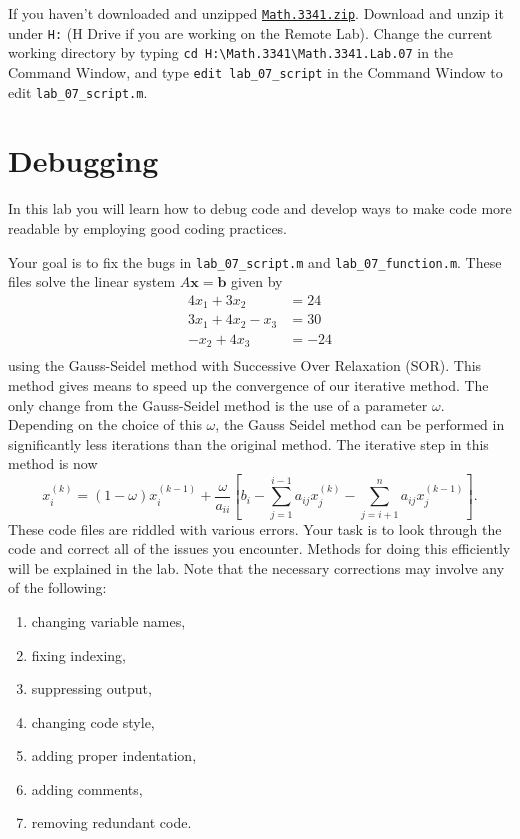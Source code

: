 If you haven't downloaded and unzipped \href{https://libaoj.in/courses/2021f/MATH3341/zip/Math.3341.zip}{\texttt{Math.3341.zip}}. Download and unzip it under \verb|H:| (H Drive if you are working on the Remote Lab). Change the current working directory by typing \verb|cd H:\Math.3341\Math.3341.Lab.07| in the Command Window, and type \verb|edit lab_07_script| in the Command Window to edit \verb|lab_07_script.m|.

\section{Debugging}
In this lab you will learn how to debug code and develop ways to make code more readable by employing good coding practices.

Your goal is to fix the bugs in \verb|lab_07_script.m| and \verb|lab_07_function.m|. These files solve the linear system $A \mathbf{x} = \mathbf{b}$ given by
\begin{align*}
    4 x_1 + 3 x_2       & = 24 \\
    3 x_1 + 4 x_2 - x_3 & = 30 \\
    - x_2 + 4 x_3       & = -24 \\
\end{align*}
using the Gauss-Seidel method with Successive Over Relaxation (SOR). This method gives means to speed up the convergence of our iterative method. The only change from the Gauss-Seidel method is the use of a parameter $\omega$. Depending on the choice of this $\omega$, the Gauss Seidel method can be performed in significantly less iterations than the original method. The iterative step in this method is now
$$
x_i^{(k)} = (1 - \omega) x_i^{(k-1)} + \frac{\omega}{a_{ii}} \left[ b_i - \sum_{j=1}^{i-1} a_{ij} x_j^{(k)} - \sum_{j=i+1}^{n} a_{ij} x_j^{(k - 1)} \right].
$$
These code files are riddled with various errors. Your task is to look through the code and correct all of the issues you encounter. Methods for doing this efficiently will be explained in the lab. Note that the necessary corrections may involve any of the following:

\begin{enumerate}[1.]
    \item changing variable names,
    \item fixing indexing,
    \item suppressing output,
    \item changing code style,
    \item adding proper indentation,
    \item adding comments,
    \item removing redundant code.
\end{enumerate}

